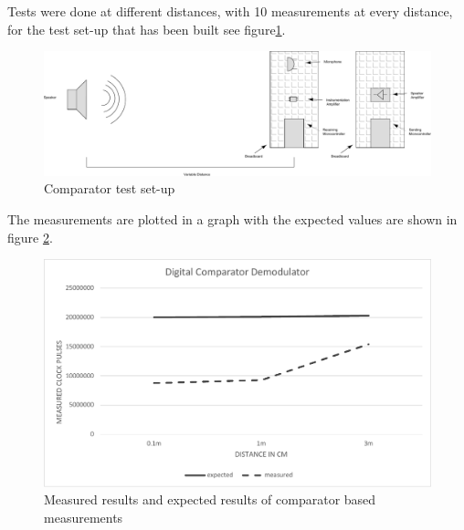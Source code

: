 \documentclass[10pt,a4paper]{article}
\begin{document}


Tests were done at different distances, with 10 measurements at every distance, for the test set-up that has been built see figure\ref{fig:acsetup}.

\begin{figure}[H]
   \centering
   \includegraphics[width=\textwidth]{actestsetup.pdf}
   \caption{Comparator test set-up}
   \label{fig:acsetup}
\end{figure}

The measurements are plotted in a graph with the expected values are shown in figure \ref{fig:comparatorgraph}. 

\begin{figure}[H]
   \centering
   \includegraphics[width=\textwidth]{acgrafiek.pdf}
   \caption{Measured results and expected results of comparator based measurements}
   \label{fig:comparatorgraph}
\end{figure}
\end{document}
